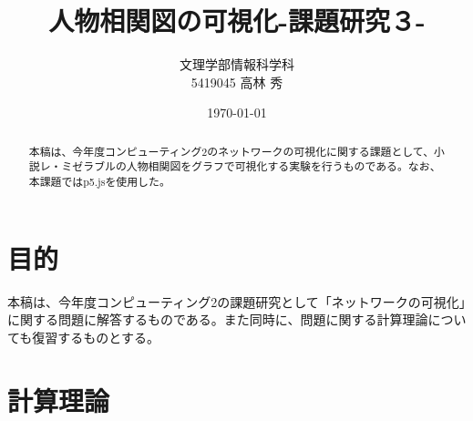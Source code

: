 \documentclass[dvipdfmx]{jsarticle}
\title{人物相関図の可視化-課題研究３-}
\author{文理学部情報科学科\\5419045 高林 秀}
\date{\today}
\begin{document}
\maketitle

\begin{abstract}
本稿は、今年度コンピューティング2のネットワークの可視化に関する課題として、小説レ・ミゼラブルの人物相関図をグラフで可視化する実験を行うものである。なお、本課題ではp5.jsを使用した。
\end{abstract}

\section{目的}
本稿は、今年度コンピューティング2の課題研究として「ネットワークの可視化」に関する問題に解答するものである。また同時に、問題に関する計算理論についても復習するものとする。
\section{計算理論}
\end{document}
